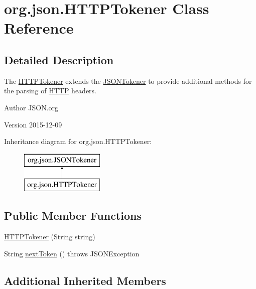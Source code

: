 \hypertarget{classorg_1_1json_1_1HTTPTokener}{\section{org.\-json.\-H\-T\-T\-P\-Tokener Class Reference}
\label{classorg_1_1json_1_1HTTPTokener}
}


\subsection{Detailed Description}
The \hyperlink{classorg_1_1json_1_1HTTPTokener}{H\-T\-T\-P\-Tokener} extends the \hyperlink{classorg_1_1json_1_1JSONTokener}{J\-S\-O\-N\-Tokener} to provide additional methods for the parsing of \hyperlink{classorg_1_1json_1_1HTTP}{H\-T\-T\-P} headers. \begin{DoxyAuthor}{Author}
J\-S\-O\-N.\-org 
\end{DoxyAuthor}
\begin{DoxyVersion}{Version}
2015-\/12-\/09 
\end{DoxyVersion}
Inheritance diagram for org.\-json.\-H\-T\-T\-P\-Tokener\-:\begin{figure}[H]
\begin{center}
\leavevmode
\includegraphics[height=2.000000cm]{classorg_1_1json_1_1HTTPTokener}
\end{center}
\end{figure}
\subsection*{Public Member Functions}
\begin{DoxyCompactItemize}
\item 
\hyperlink{classorg_1_1json_1_1HTTPTokener_a60475c4923ebf3ec28ed708bb0e4a6bc}{H\-T\-T\-P\-Tokener} (String string)
\item 
String \hyperlink{classorg_1_1json_1_1HTTPTokener_a7189a17298ad2e09dce28e52bd5ccd07}{next\-Token} ()  throws J\-S\-O\-N\-Exception 
\end{DoxyCompactItemize}
\subsection*{Additional Inherited Members}


